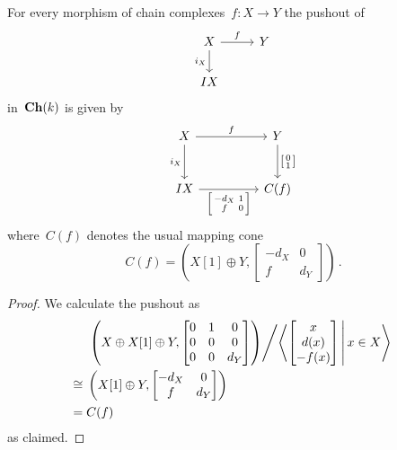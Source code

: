 \documentclass[a4paper,10pt]{scrartcl}
\begin{document}
\begin{lemma}
  For every morphism of chain complexes~$f \colon X \to Y$ the pushout of
  \[
    \begin{tikzcd}
      X
      \arrow{r}[above]{f}
      \arrow{d}[left]{i_X}
      &
      Y
      \\
      IX
      &
      {}
    \end{tikzcd}
  \]
  in~$\mathbf{Ch}(k)$ is given by
  \[
    \begin{tikzcd}[ampersand replacement = \&, row sep = large, column sep = huge]
      X
      \arrow{r}[above]{f}
      \arrow{d}[left]{i_X}
      \&
      Y
      \arrow{d}[right]{\begin{bsmallmatrix} 0 \\ 1 \end{bsmallmatrix}}
      \\
      IX
      \arrow{r}[below]{\begin{bsmallmatrix} -d_X & 1 \\ f & 0 \end{bsmallmatrix}}
      \&
      C(f)
    \end{tikzcd}
  \]
  where~$C(f)$ denotes the usual mapping cone
  \[
    C(f)
    =
    \left(
    X[1] \oplus Y,
    \begin{bmatrix}
      -d_X & 0   \\
       f   & d_Y
    \end{bmatrix}
  \right) \,.
  \]
\end{lemma}

\begin{proof}
  We calculate the pushout as
  \begin{align*}
    {}&
    \left.
    \left(
      X \oplus X[1] \oplus Y,
      \begin{bmatrix}
        0 & 1 & 0   \\
        0 & 0 & 0   \\
        0 & 0 & d_Y
      \end{bmatrix}
    \right)
    \middle/
    \gen*{
      \begin{bmatrix}
           x  \\
         d(x) \\
        -f(x)
      \end{bmatrix}
    \suchthat*
      x \in X
    }
    \right.
    \\
    \cong{}&
    \left(
      X[1] \oplus Y,
      \begin{bmatrix}
        -d_X & 0   \\
         f   & d_Y
      \end{bmatrix}
    \right)
    \\
    ={}&
    C(f)
  \end{align*}
  as claimed.
\end{proof}
\end{document}
